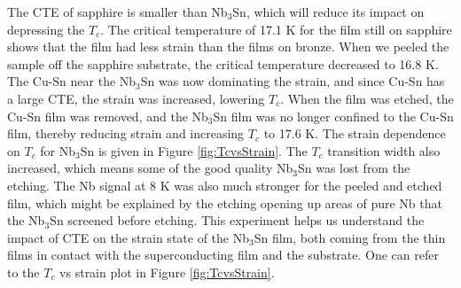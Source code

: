         
        The CTE of sapphire is smaller than Nb$_3$Sn, which will reduce its impact on depressing the $T_c$. The critical temperature of 17.1 K for the film still on sapphire shows that the film had less strain than the films on bronze. When we peeled the sample off the sapphire substrate, the critical temperature decreased to 16.8 K. The Cu-Sn near the Nb$_3$Sn was now dominating the strain, and since Cu-Sn has a large CTE, the strain was increased, lowering $T_c$. When the film was etched, the Cu-Sn film was removed, and the Nb$_3$Sn film was no longer confined to the Cu-Sn film, thereby reducing strain and increasing $T_c$ to 17.6 K. The strain dependence on $T_c$ for Nb$_3$Sn is given in Figure \ref{fig:TcvsStrain}. The $T_c$ transition width also increased, which means some of the good quality Nb$_3$Sn was lost from the etching. The Nb signal at 8 K was also much stronger for the peeled and etched film, which might be explained by the etching opening up areas of pure Nb that the Nb$_3$Sn screened before etching. This experiment helps us understand the impact of CTE on the strain state of the Nb$_3$Sn film, both coming from the thin films in contact with the superconducting film and the substrate. One can refer to the $T_c$ vs strain plot in Figure \ref{fig:TcvsStrain}.
    \clearpage
